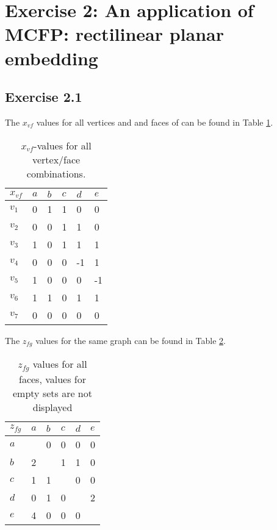 \section{Exercise 2: An application of MCFP: rectilinear planar embedding}

\subsection{Exercise 2.1}

The $x_{vf}$ values for all vertices and and faces of \cite[Figure
3]{assignment1} can be found in Table \ref{table:xvf}.

\begin{table}[h]
\centering
\begin{tabular}{l|lllll}
$x_{vf}$ & $a$ & $b$ & $c$ & $d$ & $e$ \\ \hline
$v_1$   & 0   & 1   & 1   & 0   & 0   \\
$v_2$   & 0   & 0   & 1   & 1   & 0   \\
$v_3$   & 1   & 0   & 1   & 1   & 1   \\
$v_4$   & 0   & 0   & 0   & -1  & 1   \\
$v_5$   & 1   & 0   & 0   & 0   & -1  \\
$v_6$   & 1   & 1   & 0   & 1   & 1   \\
$v_7$   & 0   & 0   & 0   & 0   & 0
\end{tabular}
\caption{$x_{vf}$-values for all vertex/face combinations.}
\label{table:xvf}
\end{table}

The $z_{fg}$ values for the same graph can be found in Table \ref{table:zfg}.

\begin{table}[h]
\centering
\begin{tabular}{l|lllll}
$z_{fg}$ & $a$ & $b$ & $c$ & $d$ & $e$ \\ \hline
$a$     &     & 0   & 0   &  0  & 0   \\
$b$     & 2   &     & 1   & 1   & 0   \\
$c$     & 1   & 1   &     & 0   & 0   \\
$d$     & 0   & 1   & 0   &     & 2   \\
$e$     & 4   & 0   & 0   & 0   &
\end{tabular}
\caption{$z_{fg}$ values for all faces, values for empty sets are not displayed}
\label{table:zfg}
\end{table}

